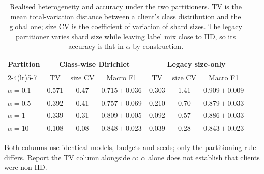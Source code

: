 \begin{table}[t]
\caption{Realised heterogeneity and accuracy under the two partitioners. TV is the mean total-variation distance between a client's class distribution and the global one; size CV is the coefficient of variation of shard sizes. The legacy partitioner varies shard size while leaving label mix close to IID, so its accuracy is flat in $\alpha$ by construction.}
\label{tab:alpha_split}
\centering\footnotesize
\setlength\tabcolsep{2.2pt}
\begin{tabular}{lcccccc}
\toprule
\textbf{Partition} & \multicolumn{3}{c}{\textbf{Class-wise Dirichlet}} & \multicolumn{3}{c}{\textbf{Legacy size-only}}\\
\cmidrule(lr){2-4}\cmidrule(lr){5-7}
 & TV & size CV & Macro F1 & TV & size CV & Macro F1\\
\midrule
$\alpha=0.1$ & 0.571 & 0.47 & 0.715\,$\pm$\,0.036 & 0.303 & 1.41 & 0.909\,$\pm$\,0.009 \\
$\alpha=0.5$ & 0.392 & 0.41 & 0.757\,$\pm$\,0.069 & 0.210 & 0.70 & 0.879\,$\pm$\,0.033 \\
$\alpha=1$ & 0.339 & 0.31 & 0.809\,$\pm$\,0.005 & 0.092 & 0.57 & 0.886\,$\pm$\,0.033 \\
$\alpha=10$ & 0.108 & 0.08 & 0.848\,$\pm$\,0.023 & 0.039 & 0.28 & 0.843\,$\pm$\,0.023 \\
\bottomrule
\end{tabular}
\vspace{1pt}

{\scriptsize Both columns use identical models, budgets and seeds; only the partitioning rule differs. Report the TV column alongside $\alpha$: $\alpha$ alone does not establish that clients were non-IID.}
\end{table}
